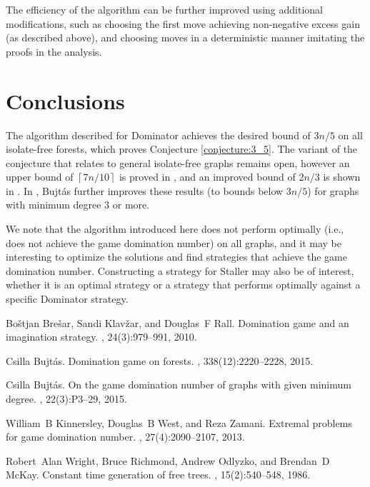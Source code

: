 \documentclass[11pt]{article}
\theoremstyle{definition}
\begin{document}
The efficiency of the algorithm can be further improved using additional modifications, such as choosing the first move achieving non-negative excess gain (as described above), 
and choosing moves in a deterministic manner imitating the proofs in the analysis.


\section{Conclusions}
\label{section:conclusions}

The algorithm described for Dominator achieves the desired bound of $3 n / 5$ on all isolate-free forests, which proves Conjecture \ref{conjecture:3_5}.
The variant of the conjecture that relates to general isolate-free graphs remains open, however an upper bound of $\left\lceil 7 n / 10 \right\rceil$ is proved in \cite{kinnersley2013extremal}, and an improved bound of $2 n / 3$ is shown in \cite{bujtas2015game}. 
In \cite{bujtas2015game}, Bujt\'as further improves these results (to bounds below $3 n / 5$) for graphs with minimum degree $3$ or more.

We note that the algorithm introduced here does not perform optimally (i.e., does not achieve the game domination number) on all graphs, 
and it may be interesting to optimize the solutions and find strategies that achieve the game domination number.
Constructing a strategy for Staller may also be of interest, whether it is an optimal strategy or a strategy that performs optimally against a specific Dominator strategy.





\begin{thebibliography}{1}

Bo{\v{s}}tjan Bre{\v{s}}ar, Sandi Klav{\v{z}}ar, and Douglas~F Rall.
\newblock Domination game and an imagination strategy.
, 24(3):979--991, 2010.

Csilla Bujt{\'a}s.
\newblock Domination game on forests.
, 338(12):2220--2228, 2015.

Csilla Bujt{\'a}s.
\newblock On the game domination number of graphs with given minimum degree.
, 22(3):P3--29, 2015.

William~B Kinnersley, Douglas~B West, and Reza Zamani.
\newblock Extremal problems for game domination number.
, 27(4):2090--2107, 2013.

Robert~Alan Wright, Bruce Richmond, Andrew Odlyzko, and Brendan~D McKay.
\newblock Constant time generation of free trees.
, 15(2):540--548, 1986.

\end{thebibliography}
\end{document}
